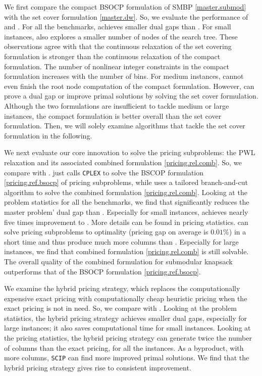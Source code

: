We first compare the compact BSOCP formulation of SMBP \eqref{master.submod} with the set cover formulation \eqref{master.dw}. So, we evaluate the performance of \bsocpcomp and \dwbc. For all the benchmarks, \dwbc achieves smaller dual gaps than  \bsocpcomp. For small instances, \dwbc also  explores a smaller number of nodes of the search tree. These observations agree with   that the continuous relaxation of the set covering formulation is stronger than the continuous relaxation of the compact formulation. The number of nonlinear integer constraints in the compact formulation increases with the number of bins. For medium instances,   \bsocpcomp cannot even finish the root node computation of the compact formulation. However, \dwbc can prove a dual gap or improve primal solutions by solving the set cover formulation. Although the two formulations are insufficient to tackle medium or large instances, the compact formulation is better overall than the set cover formulation.  Then, we will solely examine algorithms that tackle the set cover formulation in the following.

We next evaluate our core innovation to solve the pricing subproblems: the PWL relaxation and its associated combined formulation \eqref{pricing.rel.comb}. So, we compare  \dwbc with  \dwpwl. \dwbc just calls \texttt{CPLEX} to solve the BSCOP formulation \eqref{pricing.ref.bsocp} of pricing subproblems, while \dwpwl uses a tailored branch-and-cut algorithm to solve the combined formulation \eqref{pricing.rel.comb}. Looking at  the problem statistics for all the benchmarks, we find that \dwpwl significantly reduces the master problem' dual gap than \dwbc. Especially for small instances, \dwpwl achieves nearly five times improvement to \dwbc. More details can be found in pricing statistics. \dwpwl can solve pricing subproblems to optimality (pricing gap on average is $0.01\%$) in a short time and thus produce much more columns than \dwbc. Especially for large instances, we find that combined formulation \eqref{pricing.rel.comb} is still solvable. The overall quality of  the combined formulation for submodular knapsack outperforms that of the BSOCP formulation \eqref{pricing.ref.bsocp}.

We examine the hybrid pricing strategy, which replaces the computationally expensive exact pricing with computationally cheap heuristic pricing when the exact pricing is not in need. So, we compare \dwpwl with \dwhybrid. Looking at the problem statistics, the hybrid pricing strategy achieves smaller dual gaps, especially for large instances; it also saves computational time for small instances.  Looking at the pricing statistics, the hybrid pricing strategy can generate twice the number of columns than the exact pricing, for all the instances. As a byproduct, with more columns, \texttt{SCIP} can find more improved primal solutions. We find that the hybrid pricing strategy gives rise to consistent improvement.



